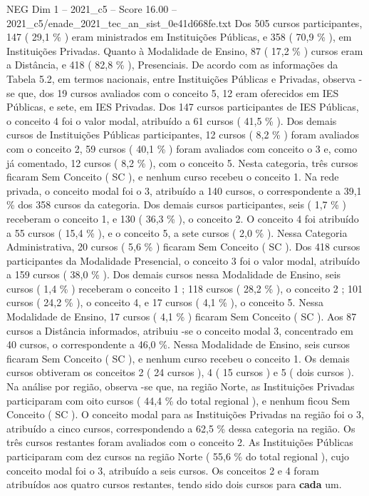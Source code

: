 \begin{textsample}{NEG Dim 1 – 2021\_c5 – Score 16.00 – 2021\_c5/enade\_2021\_tec\_an\_sist\_0e41d668fe.txt}
Dos 505 cursos participantes, 147 ( 29,1 \% ) eram ministrados em Instituições Públicas, e 358 ( 70,9 \% ), em Instituições Privadas.
Quanto à Modalidade de Ensino, 87 ( 17,2 \% ) cursos eram a Distância, e 418 ( 82,8 \% ), Presenciais.
De acordo com as informações da Tabela 5.2, em termos nacionais, entre Instituições Públicas e Privadas, observa -se que, dos 19 cursos avaliados com o conceito 5, 12 eram oferecidos em IES Públicas, e sete, em IES Privadas.
Dos 147 cursos participantes de IES Públicas, o conceito 4 foi o valor modal, atribuído a 61 cursos ( 41,5 \% ).
Dos demais cursos de Instituições Públicas participantes, 12 cursos ( 8,2 \% ) foram avaliados com o conceito 2, 59 cursos ( 40,1 \% ) foram avaliados com conceito o 3 e, como já comentado, 12 cursos ( 8,2 \% ), com o conceito 5.
Nesta categoria, três cursos ficaram Sem Conceito ( SC ), e nenhum curso recebeu o conceito 1.
Na rede privada, o conceito modal foi o 3, atribuído a 140 cursos, o correspondente a 39,1 \% dos 358 cursos da categoria.
Dos demais cursos participantes, seis ( 1,7 \% ) receberam o conceito 1, e 130 ( 36,3 \% ), o conceito 2.
O conceito 4 foi atribuído a 55 cursos ( 15,4 \% ), e o conceito 5, a sete cursos ( 2,0 \% ).
Nessa Categoria Administrativa, 20 cursos ( 5,6 \% ) ficaram Sem Conceito ( SC ).
Dos 418 cursos participantes da Modalidade Presencial, o conceito 3 foi o valor modal, atribuído a 159 cursos ( 38,0 \% ).
Dos demais cursos nessa Modalidade de Ensino, seis cursos ( 1,4 \% ) receberam o conceito 1 ; 118 cursos ( 28,2 \% ), o conceito 2 ; 101 cursos ( 24,2 \% ), o conceito 4, e 17 cursos ( 4,1 \% ), o conceito 5.
Nessa Modalidade de Ensino, 17 cursos ( 4,1 \% ) ficaram Sem Conceito ( SC ).
Aos 87 cursos a Distância informados, atribuiu -se o conceito modal 3, concentrado em 40 cursos, o correspondente a 46,0 \%.
Nessa Modalidade de Ensino, seis cursos ficaram Sem Conceito ( SC ), e nenhum curso recebeu o conceito 1.
Os demais cursos obtiveram os conceitos 2 ( 24 cursos ), 4 ( 15 cursos ) e 5 ( dois cursos ).
Na análise por região, observa -se que, na região Norte, as Instituições Privadas participaram com oito cursos ( 44,4 \% do total regional ), e nenhum ficou Sem Conceito ( SC ).
O conceito modal para as Instituições Privadas na região foi o 3, atribuído a cinco cursos, correspondendo a 62,5 \% dessa categoria na região.
Os três cursos restantes foram avaliados com o conceito 2.
As Instituições Públicas participaram com dez cursos na região Norte ( 55,6 \% do total regional ), cujo conceito modal foi o 3, atribuído a seis cursos.
Os conceitos 2 e 4 foram atribuídos aos quatro cursos restantes, tendo sido dois cursos para \textbf{cada} um.

\end{textsample}
